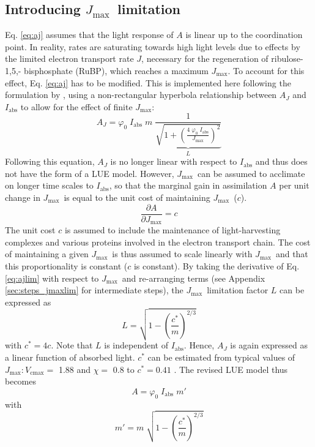 \documentclass{myreport}
\newcommand{\vcmax}{$V_{\text{cmax}}$}
\newcommand{\jmax}{$J_{\text{max}}$}
\begin{document}
\subsection{Introducing \jmax\ limitation}
\label{sec:jmax}
Eq. \ref{eq:aj} assumes that the light response of $A$ is linear up to the coordination point. In reality, rates are saturating towards high light levels due to effects by the limited electron transport rate $J$, necessary for the regeneration of ribulose-1,5,- bisphosphate (RuBP), which reaches a maximum \jmax . To account for this effect, Eq. \ref{eq:aj} has to be modified. This is implemented here following the formulation by \cite{smith37}, using a non-rectangular hyperbola relationship between $A_J$ and $I_{\mathrm{abs}}$ to allow for the effect of finite $J_{\mathrm{max}}$:
\begin{equation}
\label{eq:ajlim}
    A_J = \varphi_0 \; I_{\mathrm{abs}} \; m \; \underbrace{ \frac{1}{\sqrt{1+ \left( \frac{4\;\varphi_0\;I_{\mathrm{abs}}}{J_{\mathrm{max}}} \right)^{2}}} }_{L}
\end{equation}
Following this equation, $A_J$ is no longer linear with respect to $I_{\mathrm{abs}}$ and thus does not have the form of a LUE model. However, \jmax\ can be assumed to acclimate on longer time scales to $I_{\mathrm{abs}}$, so that the marginal gain in assimilation $A$ per unit change in \jmax\ is equal to the unit cost of maintaining \jmax\ ($c$).
\begin{equation}
\label{eq:jmaxpartial}
    \frac{\partial A}{\partial J_{\mathrm{max}}} = c 
\end{equation}
The unit cost $c$ is assumed to include the maintenance of light-harvesting complexes and various proteins involved in the electron transport chain. The cost of maintaining a given \jmax\ is thus assumed to scale linearly with \jmax\ and that this proportionality is constant ($c$ is constant). By taking the derivative of Eq. \ref{eq:ajlim} with respect to \jmax\ and re-arranging terms (see Appendix \ref{sec:steps_jmaxlim} for intermediate steps), the \jmax\ limitation factor $L$ can be expressed as
\begin{equation}
\label{eq:factor_jmaxlim}
    L = \sqrt{ 1 - \left( \frac{c^\ast}{m} \right)^{2/3} }
\end{equation}
with $c^\ast = 4c$. Note that $L$ is independent of $I_\text{abs}$. Hence, $A_J$ is again expressed as a linear function of absorbed light. $c^\ast$ can be estimated from typical values of \jmax $:$\vcmax $=$ 1.88 \citep{kattge07} and $\chi =$ 0.8 \citep{lloyd94} to $c^\ast = 0.41$ \citep{wang17natpl}. The revised LUE model thus becomes
\begin{equation}
\label{eq:ajlim4}
    A = \varphi_0 \; I_{\mathrm{abs}} \; m'
\end{equation}
with
\begin{equation}
    m' = m \; \sqrt{1 - \left( \frac{c^\ast}{m} \right)^{2/3} }
\end{equation}
\end{document}

